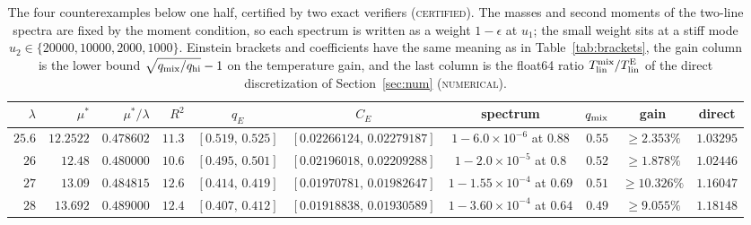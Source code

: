 \documentclass[11pt]{article}
\newcommand{\Tlin}{T_{\mathrm{lin}}}
\newcommand{\CE}{C_E}
\newcommand{\muS}{\mu^{*}}
\theoremstyle{definition}
\theoremstyle{remark}
\begin{document}
\begin{table}[t]
\centering
\scriptsize
\setlength{\tabcolsep}{2.5pt}
\renewcommand{\arraystretch}{1.15}
\begin{tabular}{@{}rrrrcccccc@{}}
\toprule
$\lambda$ & $\muS$ & $\muS/\lambda$ & $R^2$ & $q_E$ & $\CE$ & spectrum & $q_{\rm mix}$ & gain & direct\\
\midrule
$25.6$ & $12.2522$ & $0.478602$ & $11.3$ & $[0.519,\,0.525]$ &
$[0.02266124,\,0.02279187]$ & $1-6.0\times10^{-6}$ at $0.88$ & $0.55$ & $\ge2.353\%$ &
$1.03295$\\
$26$ & $12.48$ & $0.480000$ & $10.6$ & $[0.495,\,0.501]$ &
$[0.02196018,\,0.02209288]$ & $1-2.0\times10^{-5}$ at $0.8$ & $0.52$ & $\ge1.878\%$ &
$1.02446$\\
$27$ & $13.09$ & $0.484815$ & $12.6$ & $[0.414,\,0.419]$ &
$[0.01970781,\,0.01982647]$ & $1-1.55\times10^{-4}$ at $0.69$ & $0.51$ & $\ge10.326\%$ &
$1.16047$\\
$28$ & $13.692$ & $0.489000$ & $12.4$ & $[0.407,\,0.412]$ &
$[0.01918838,\,0.01930589]$ & $1-3.60\times10^{-4}$ at $0.64$ & $0.49$ & $\ge9.055\%$ &
$1.18148$\\
\bottomrule
\end{tabular}
\caption{The four counterexamples below one half, certified by two exact verifiers
(\textsc{certified}). The masses and second moments of the two-line spectra are fixed by
the moment condition, so each spectrum is written as a weight $1-\epsilon$ at $u_1$; the
small weight sits at a stiff mode $u_2\in\{20000,10000,2000,1000\}$. Einstein brackets and
coefficients have the same meaning as in Table~\ref{tab:brackets}, the gain column is the
lower bound $\sqrt{q_{\rm mix}/q_{\rm hi}}-1$ on the temperature gain, and the last column
is the float64 ratio $\Tlin^{\rm mix}/\Tlin^{\rm E}$ of the direct discretization of
Section~\ref{sec:num} (\textsc{numerical}).}
\label{tab:half}
\end{table}
\end{document}
